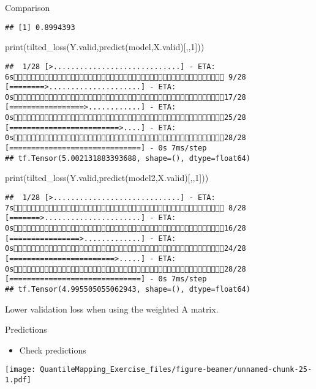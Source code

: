 \documentclass[
  ignorenonframetext,
]{beamer}
\newenvironment{Shaded}{\begin{snugshade}}{\end{snugshade}}
\newcommand{\DecValTok}[1]{\textcolor[rgb]{0.00,0.00,0.81}{#1}}
\newcommand{\FunctionTok}[1]{\textcolor[rgb]{0.00,0.00,0.00}{#1}}
\newcommand{\NormalTok}[1]{#1}
\providecommand{\tightlist}{%
  \setlength{\itemsep}{0pt}\setlength{\parskip}{0pt}}
\begin{document}
\begin{frame}[fragile]{Comparison}
\begin{verbatim}
## [1] 0.8994393
\end{verbatim}

\begin{Shaded}
\begin{Highlighting}[]
\FunctionTok{print}\NormalTok{(}\FunctionTok{tilted\_loss}\NormalTok{(Y.valid,}\FunctionTok{predict}\NormalTok{(model,X.valid)[,,}\DecValTok{1}\NormalTok{]))}
\end{Highlighting}
\end{Shaded}

\begin{verbatim}
##  1/28 [>.............................] - ETA: 6s 9/28 [========>.....................] - ETA: 0s17/28 [=================>............] - ETA: 0s25/28 [=========================>....] - ETA: 0s28/28 [==============================] - 0s 7ms/step
## tf.Tensor(5.002131883393688, shape=(), dtype=float64)
\end{verbatim}

\begin{Shaded}
\begin{Highlighting}[]
\FunctionTok{print}\NormalTok{(}\FunctionTok{tilted\_loss}\NormalTok{(Y.valid,}\FunctionTok{predict}\NormalTok{(model2,X.valid)[,,}\DecValTok{1}\NormalTok{]))}
\end{Highlighting}
\end{Shaded}

\begin{verbatim}
##  1/28 [>.............................] - ETA: 7s 8/28 [=======>......................] - ETA: 0s16/28 [================>.............] - ETA: 0s24/28 [========================>.....] - ETA: 0s28/28 [==============================] - 0s 7ms/step
## tf.Tensor(4.995505055062943, shape=(), dtype=float64)
\end{verbatim}

Lower validation loss when using the weighted A matrix.
\end{frame}

\begin{frame}{Predictions}
\protect\hypertarget{predictions-1}{}
\begin{itemize}
\tightlist
\item
  Check predictions
\end{itemize}

\texttt{[image: QuantileMapping\_Exercise\_files/figure-beamer/unnamed-chunk-25-1.pdf]}
\end{frame}
\end{document}
